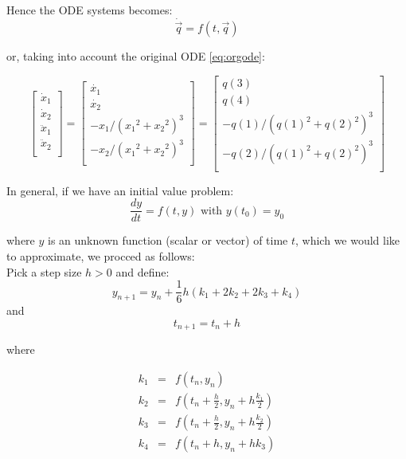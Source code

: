 \documentclass[12pt,a4paper,twoside]{report}
\begin{document}
Hence the ODE systems becomes:
\begin{equation}
  \dot{\vec{q}} = f( t, \vec{q} )
\end{equation}

or, taking into account the original ODE \ref{eq:orgode}:

\begin{equation}
  \begin{bmatrix}
    \dot{x}_1 \\
    \dot{x}_2 \\
    \ddot{x}_1 \\
    \ddot{x}_2 \\
  \end{bmatrix}
  =
  \begin{bmatrix}
    \dot{x_1} \\
    \dot{x_2} \\
    - x_1 / {({x_1}^2 + {x_2}^2)}^3 \\
    - x_2 / {({x_1}^2 + {x_2}^2)}^3 \\
  \end{bmatrix}
  =
  \begin{bmatrix}
    q(3) \\
    q(4) \\
    -q(1) / {(q(1)^2 +q(2)^2)}^3 \\
    -q(2) / {(q(1)^2 +q(2)^2)}^3 \\
  \end{bmatrix}
\end{equation}

In general, if we have an initial value problem:
\begin{equation}
  \frac{dy}{dt} = f(t,y) \text{ with } y(t_0) = y_0
\end{equation}

where \( y \) is an unknown function (scalar or vector) of time \( t \), which we 
would like to approximate, we procced as follows:\\
Pick a step size \( h > 0 \) and define:
\begin{equation}
  y_{n+1} = y_n + \frac{1}{6} h (k_1 + 2 k_2 + 2 k_3 + k_4)
\end{equation}
and
\begin{equation}
  t_{n+1} = t_n + h
\end{equation}

where

\begin{equation}
  \begin{array}{lcl}
  k_1 & = & f(t_n, y_n) \\
  k_2 & = & f(t_n + \frac{h}{2}, y_n + h\frac{k_1}{2}) \\
  k_3 & = & f(t_n + \frac{h}{2}, y_n + h\frac{k_2}{2}) \\
  k_4 & = & f(t_n + h, y_n + h k_3) \\
  \end{array}
\end{equation}
\end{document}
